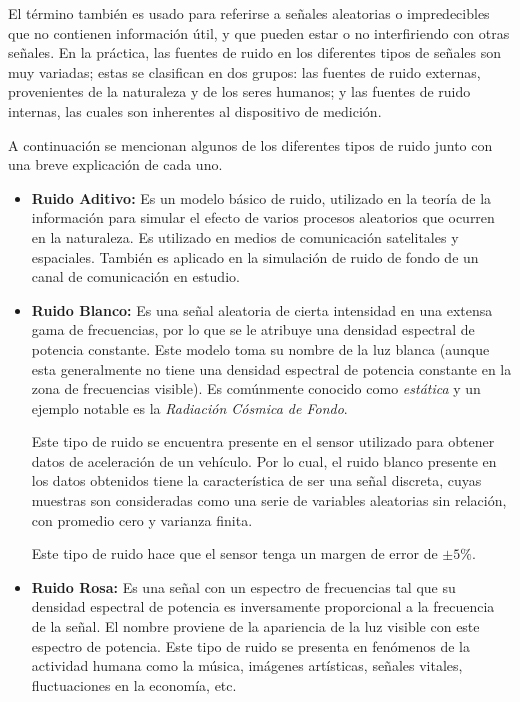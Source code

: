 El término también es usado para referirse a señales aleatorias o impredecibles que no contienen información útil, y que pueden estar o no interfiriendo con otras señales.
En la práctica, las fuentes de ruido en los diferentes tipos de señales son muy variadas; estas se clasifican en dos grupos: las fuentes de ruido externas, provenientes de la naturaleza y de los seres humanos; y las fuentes de ruido internas, las cuales son inherentes al dispositivo de medición. 

A continuación se mencionan algunos de los diferentes tipos de ruido junto con una breve explicación de cada uno.

\begin{itemize}

\item {\bf Ruido Aditivo:} Es un modelo básico de ruido, utilizado en la teoría de la información para simular el efecto de varios procesos aleatorios que ocurren en la naturaleza.
Es utilizado en medios de comunicación satelitales y espaciales. 
También es aplicado en la simulación de ruido de fondo de un canal de comunicación en estudio.

\item {\bf Ruido Blanco:} Es una señal aleatoria de cierta intensidad en una extensa gama de frecuencias, por lo que se le atribuye una densidad espectral de potencia constante. 
Este modelo toma su nombre de la luz blanca (aunque esta generalmente no tiene una densidad espectral de potencia constante en la zona de frecuencias visible). 
Es comúnmente conocido como {\em estática} y un ejemplo notable es la {\em Radiación Cósmica de Fondo}.

Este tipo de ruido se encuentra presente en el sensor utilizado para obtener datos de aceleración de un vehículo. 
Por lo cual, el ruido blanco presente en los datos obtenidos tiene la característica de ser una señal discreta, cuyas muestras son consideradas como una serie de variables aleatorias sin relación, con promedio cero y varianza finita.

Este tipo de ruido hace que el sensor tenga un margen de error de $\pm 5\%$.

\item {\bf Ruido Rosa:} Es una señal con un espectro de frecuencias tal que su densidad espectral de potencia es inversamente proporcional a la frecuencia de la señal.
El nombre proviene de la apariencia de la luz visible con este espectro de potencia.
Este tipo de ruido se presenta en fenómenos de la actividad humana como la música, imágenes artísticas, señales vitales, fluctuaciones en la economía, etc.


\end{itemize}
